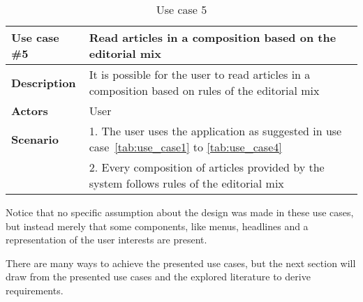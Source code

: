 \begin{table}[h!tp]
\myfloatalign
	\begin{tabular}{p{}|p{}} \toprule 
		\textbf{Use case \#5} & Read articles in a composition based on the editorial mix\\ \midrule
		\textbf{Description} & It is possible for the user to read articles in a composition based on rules of the editorial mix\\ \midrule
		\textbf{Actors} & User\\ \midrule
		\textbf{Scenario} 	& 1. The user uses the application as suggested in use case~\ref{tab:use_case1} to \ref{tab:use_case4}\\
								& 2. Every composition of articles provided by the system follows rules of the editorial mix\\
								\bottomrule
	\end{tabular}
\caption{Use case 5}
\label{tab:use_case5}
\end{table}
\cleardoublepage
Notice that no specific assumption about the design was made in these use cases, but instead merely that some components, like menus, headlines and a representation of the user interests are present.

There are many ways to achieve the presented use cases, but the next section will draw from the presented use cases and the explored literature to derive requirements.
%
%
%
%
%


